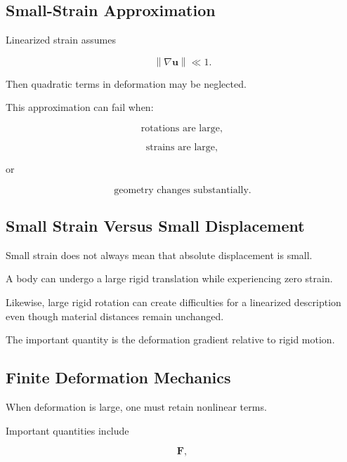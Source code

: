 \subsection{Small-Strain Approximation}
\label{subsec:small-strain-approximation}

Linearized strain assumes

\[
\boxed{
\left\|
\nabla\mathbf{u}
\right\|
\ll1.
}
\]

Then quadratic terms in deformation may be neglected.

This approximation can fail when:

\[
\boxed{
\text{rotations are large},
}
\]

\[
\boxed{
\text{strains are large},
}
\]

or

\[
\boxed{
\text{geometry changes substantially}.
}
\]

\subsection{Small Strain Versus Small Displacement}
\label{subsec:small-strain-small-displacement}

Small strain does not always mean that absolute displacement is small.

A body can undergo a large rigid translation while experiencing zero strain.

Likewise, large rigid rotation can create difficulties for a linearized
description even though material distances remain unchanged.

The important quantity is the deformation gradient relative to rigid motion.

\subsection{Finite Deformation Mechanics}
\label{subsec:finite-deformation-mechanics}

When deformation is large, one must retain nonlinear terms.

Important quantities include

\[
\boxed{
\mathbf{F},
}
\]

